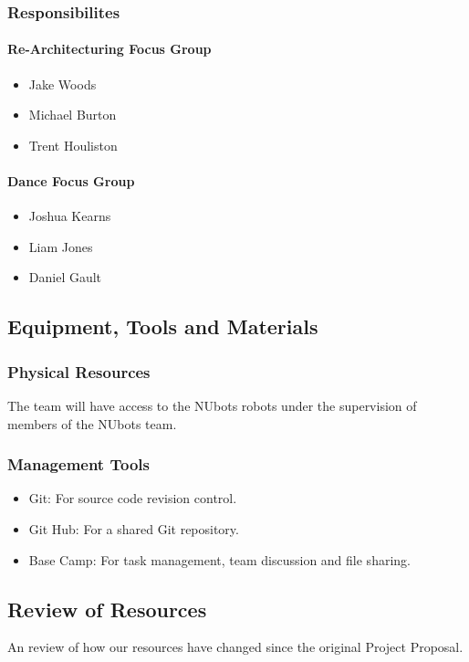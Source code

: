 \documentclass[english,12pt]{scrartcl}
\begin{document}
			\subsubsection{Responsibilites}
				\paragraph{Re-Architecturing Focus Group}
					\begin{itemize}
						\item Jake Woods
						\item Michael Burton
						\item Trent Houliston
					\end{itemize}
				\paragraph{Dance Focus Group}
					\begin{itemize}
						\item Joshua Kearns
						\item Liam Jones
						\item Daniel Gault
					\end{itemize}
		\subsection{Equipment, Tools and Materials}
			\subsubsection{Physical Resources}
			The team will have access to the NUbots robots under the supervision of members of the NUbots team.
			\subsubsection{Management Tools}
				\begin{itemize}
					\item Git: For source code revision control.
					\item Git Hub: For a shared Git repository.
					\item Base Camp: For task management, team discussion and file sharing.
				\end{itemize}
		\subsection {Review of Resources}
			An review of how our resources have changed since the original Project Proposal.
\end{document}
